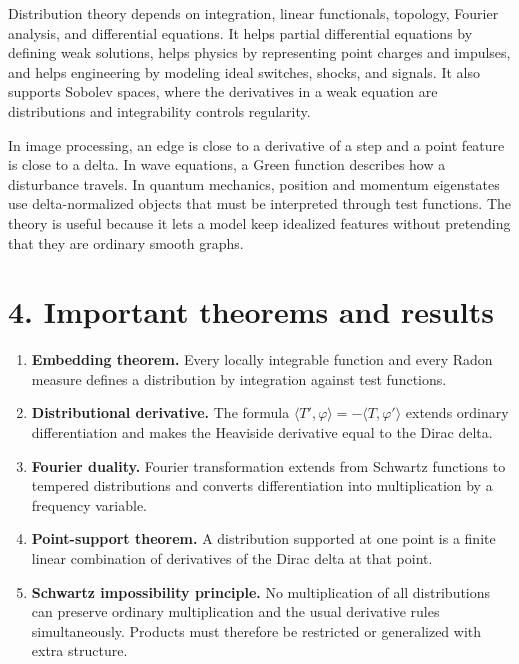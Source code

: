 Distribution theory depends on integration, linear functionals, topology, Fourier analysis, and differential equations. It helps partial differential equations by defining weak solutions, helps physics by representing point charges and impulses, and helps engineering by modeling ideal switches, shocks, and signals. It also supports Sobolev spaces, where the derivatives in a weak equation are distributions and integrability controls regularity.

In image processing, an edge is close to a derivative of a step and a point feature is close to a delta. In wave equations, a Green function describes how a disturbance travels. In quantum mechanics, position and momentum eigenstates use delta-normalized objects that must be interpreted through test functions. The theory is useful because it lets a model keep idealized features without pretending that they are ordinary smooth graphs.

\section*{4. Important theorems and results}
\begin{enumerate}[leftmargin=*,itemsep=0.35em]

\item \textbf{Embedding theorem.} Every locally integrable function and every Radon measure defines a distribution by integration against test functions. \cite{distribution_theory_ref1}

\item \textbf{Distributional derivative.} The formula $\langle T',\varphi\rangle=-\langle T,\varphi'\rangle$ extends ordinary differentiation and makes the Heaviside derivative equal to the Dirac delta. \cite{distribution_theory_ref2}

\item \textbf{Fourier duality.} Fourier transformation extends from Schwartz functions to tempered distributions and converts differentiation into multiplication by a frequency variable. \cite{distribution_theory_ref8}

\item \textbf{Point-support theorem.} A distribution supported at one point is a finite linear combination of derivatives of the Dirac delta at that point. \cite{distribution_theory_ref1}

\item \textbf{Schwartz impossibility principle.} No multiplication of all distributions can preserve ordinary multiplication and the usual derivative rules simultaneously. Products must therefore be restricted or generalized with extra structure. \cite{distribution_theory_ref7}
\end{enumerate}

